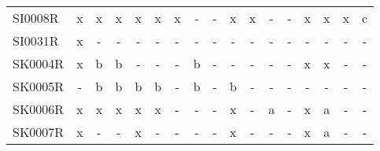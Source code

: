 \begin{table}[H]
{{\begin{tabular}{l|cccccccccccccccc}
        SI0008R &  x &   x &    x &      x &   x &    x &    - &    - &      x &    x &    - &   - &      x &    x &    x &     c \\
        SI0031R &  x &   - &    - &      - &   - &    - &    - &    - &      - &    - &    - &   - &      - &    - &    - &     - \\
        SK0004R &  x &   b &    b &      - &   - &    - &    b &    - &      - &    - &    - &   - &      x &    x &    - &     - \\
        SK0005R &  - &   b &    b &      b &   b &    - &    b &    - &      b &    - &    - &   - &      - &    - &    - &     - \\
        SK0006R &  x &   x &    x &      x &   x &    - &    - &    - &      x &    - &    a &   - &      x &    a &    - &     - \\
        SK0007R &  x &   - &    - &      x &   - &    - &    - &    - &      x &    - &    - &   - &      x &    a &    - &     - \\
\bottomrule
\end{tabular}
 }}
 \end{table}
\vfill


\renewcommand\bibname{References}    %
%


\cleartoleftpage
